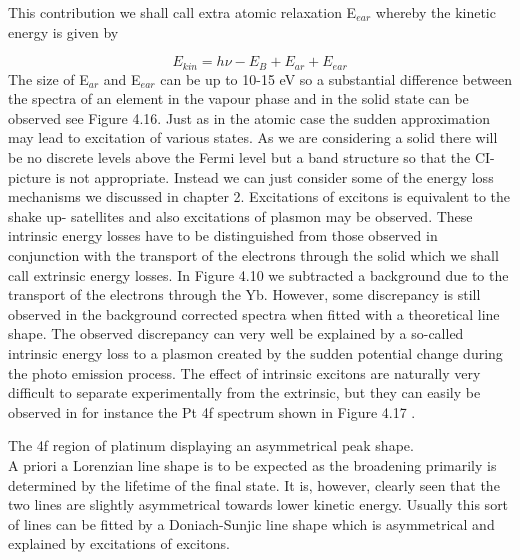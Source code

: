              This contribution we shall call extra atomic relaxation
          E$_{ear}$ whereby the kinetic energy is given by

\begin{equation}
E_{kin}=h\nu-E_{B}+E_{ar} +E_{ear}
\end{equation}
             The size of E$_{ar}$ and E$_{ear}$ can be up to 10-15 eV
          so a substantial difference between the spectra of an
          element in the vapour phase and in the solid state can be
          observed see Figure 4.16.
          Just as in the atomic case the sudden approximation may lead
          to excitation of various states. As we are considering
          a solid there will be no discrete levels above the Fermi level
          but a band structure so that the CI-picture is not
          appropriate. Instead we can just consider some of the energy
          loss mechanisms we discussed in chapter 2. Excitations of
          excitons is equivalent to the shake up- satellites and also
          excitations of plasmon may be observed. These intrinsic
          energy losses have to be distinguished from those observed in
          conjunction with the transport of the electrons through the
          solid which we shall call extrinsic energy losses. In Figure
          4.10 we subtracted a background due to the transport of the
          electrons through  the  Yb.  However,  some  discrepancy  is
          still observed in  the  background  corrected  spectra  when
          fitted  with  a  theoretical  line   shape.   The   observed
          discrepancy can very  well  be  explained  by  a  so-called
          intrinsic energy loss to a plasmon  created  by  the  sudden
          potential change during  the  photo  emission  process.  The
          effect of intrinsic excitons are naturally very difficult to
          separate experimentally from the  extrinsic,  but  they  can
          easily be observed in for instance the Pt 4f spectrum  shown
          in Figure 4.17 \cite{wertheim}.\\

\vspace{9cm}

              The 4f region of platinum
          displaying an asymmetrical peak shape.\\

             A priori a Lorenzian line shape is to be expected as the
          broadening primarily is determined by the lifetime of the
          final state. It is, however, clearly seen that the two lines
          are slightly asymmetrical towards lower kinetic energy.
          Usually this sort of lines can be fitted by a Doniach-Sunjic
          line shape which is asymmetrical \cite{doniach} and
          explained by excitations of excitons.

